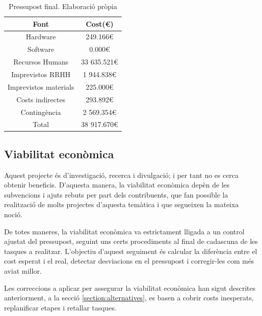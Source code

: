 \documentclass[a4paper]{report}
\begin{document}
	\begin{table}
		\centering
		\begin{tabular}{|| c | c ||}
			\hline
			\textbf{Font} & \textbf{Cost(\euro)} \\
			\hline \hline
			Hardware & 249.166\euro \\
			Software & 0.000\euro \\
			Recursos Humans & 33 635.521\euro \\
			Imprevistos RRHH & 1 944.838\euro \\
			Imprevistos materials & 225.000\euro \\
			Costs indirectes & 293.892\euro \\
			Contingència  & 2 569.354\euro \\
			\hline \hline
			Total & 38 917.670\euro \\
			\hline
		\end{tabular}
		\caption[Pressupost final]{Pressupost final. Elaboració pròpia}
		\label{table:pressupostFinal}
	\end{table}
	
	\subsection{Viabilitat econòmica} \label{section:viabilitat}
	Aquest projecte és d'investigació, recerca i divulgació; i per tant no es cerca obtenir beneficis. D'aquesta manera, la viabilitat econòmica depèn de les subvencions i ajuts rebuts per part dels contribuents, que fan possible la realització de molts projectes d'aquesta temàtica i que segueixen la mateixa noció. \par
	De totes maneres, la viabilitat econòmica va estrictament lligada a un control ajustat del pressupost, seguint uns certs procediments al final de cadascuna de les tasques a realitzar. L'objectiu d'aquest seguiment és calcular la diferència entre el cost esperat i el real, detectar desviacions en el pressupost i corregir-les com més aviat millor. \par
	Les correccions a aplicar per assegurar la viabilitat econòmica han sigut descrites anteriorment, a la secció \ref{section:alternatives}, es basen a cobrir costs inesperats, replanificar etapes i retallar tasques.
	
\end{document}
